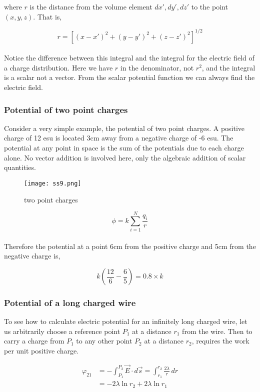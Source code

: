 \documentclass[svgnames]{article}
\begin{document}
 where $r$ is the distance from the volume element $dx', dy', dz'$ to the point $(x, y, z)$. That is, 
 
 \[ r = [(x-x')^2 + (y-y')^2 + (z-z')^2 ]^{1/2} \] \\
 
 Notice the difference between this integral and the integral for the electric
 field of a charge distribution. Here we have $r$ in the denominator, not
 $r^2$, and the integral is a scalar not a vector. From the scalar potential
 function we can always find the electric field.
 
 \subsubsection{Potential of two point charges} 
 
 Consider a very simple example, the potential of two point charges. A positive
 charge of 12 esu is located 3cm away from a negative charge of -6 esu. The
 potential at any point in space is the sum of the potentials due to each
 charge alone. No vector addition is involved here, only the algebraic addition
 of scalar quantities.

\begin{figure}
  \centering
  \texttt{[image: ss9.png]}
  \caption{two point charges}
\end{figure}

\[ \phi = k\sum_{i=1}^N \frac{q_i}{r} \] \\

Therefore the potential at a point 6cm from the positive charge and 5cm from the negative charge is, 

\[
k (\frac{12}{6} - \frac{6}{5}) = 0.8 \times k
\]

\subsubsection{Potential of a long charged wire} 

To see how to calculate electric potential for an infinitely long charged wire,
let us arbitrarily choose a reference point $P_1$ at a distance $r_1$ from the
wire. Then to carry a charge from $P_1$ to any other point $P_2$ at a distance
$r_2$, requires the work per unit positive charge.

\begin{align*} 
\varphi_{21} &= -\int_{P_1}^{P_2} \vec{E} \cdot d\vec{s} = \int_{r_1}^{r_2} \frac{2\lambda}{r} \, dr \\
&= -2 \lambda \ln r_2 + 2\lambda \ln r_1 
\end{align*} \\
\end{document}

